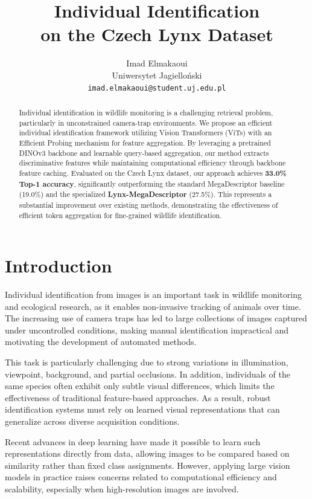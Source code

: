 \documentclass{article}
\title{Individual Identification \\ on the Czech Lynx Dataset}
\author{%
  
  Imad Elmakaoui\\
  Uniwersytet Jagielloński\\
  \texttt{imad.elmakaoui@student.uj.edu.pl} \\
  
}
\begin{document}
\maketitle

\begin{abstract}
Individual identification in wildlife monitoring is a challenging retrieval problem, particularly in unconstrained camera-trap environments. We propose an efficient individual identification framework utilizing Vision Transformers (ViTs) with an Efficient Probing mechanism for feature aggregation. By leveraging a pretrained DINOv3 backbone and learnable query-based aggregation, our method extracts discriminative features while maintaining computational efficiency through backbone feature caching. Evaluated on the Czech Lynx dataset, our approach achieves \textbf{33.0\% Top-1 accuracy}, significantly outperforming the standard MegaDescriptor baseline (19.0\%) and the specialized \textbf{Lynx-MegaDescriptor} (27.5\%). This represents a substantial improvement over existing methods, demonstrating the effectiveness of efficient token aggregation for fine-grained wildlife identification.
\end{abstract}

\section{Introduction}

Individual identification from images is an important task in wildlife monitoring and ecological research, as it enables non-invasive tracking of animals over time. The increasing use of camera traps has led to large collections of images captured under uncontrolled conditions, making manual identification impractical and motivating the development of automated methods.

This task is particularly challenging due to strong variations in illumination, viewpoint, background, and partial occlusions. In addition, individuals of the same species often exhibit only subtle visual differences, which limits the effectiveness of traditional feature-based approaches. As a result, robust identification systems must rely on learned visual representations that can generalize across diverse acquisition conditions.

Recent advances in deep learning have made it possible to learn such representations directly from data, allowing images to be compared based on similarity rather than fixed class assignments. However, applying large vision models in practice raises concerns related to computational efficiency and scalability, especially when high-resolution images are involved.
\end{document}
